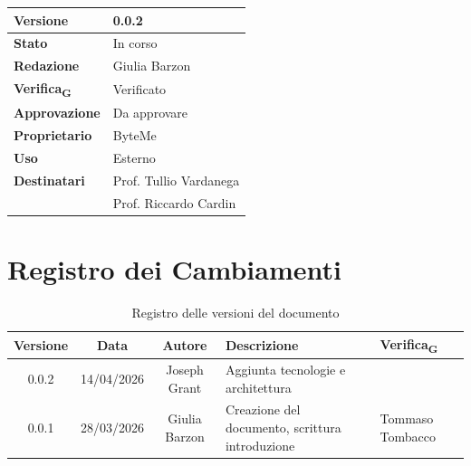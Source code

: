 \documentclass[11pt,a4paper]{article}
\newcommand{\gls}[1]{#1\textsubscript{G}}
\begin{document}
\begin{titlepage}
    \begin{table}[H]
        \centering
        \begin{tabular}{|l|p{5cm}|}
            \hline
            \textbf{Versione} & 0.0.2 \\
            \hline
            \textbf{Stato} & In corso \\
            \hline
            \textbf{Redazione} & Giulia Barzon \\
            \hline
            \textbf{\gls{Verifica}} & Verificato \\
            \hline
            \textbf{Approvazione} & Da approvare\\
            \hline
            \textbf{Proprietario} & ByteMe \\
            \hline
            \textbf{Uso} & Esterno \\
            \hline
            \textbf{Destinatari} & Prof. Tullio Vardanega \\ & Prof. Riccardo Cardin \\
            \hline
        \end{tabular}
    \end{table}
    
    \vfill
\end{titlepage}

\thispagestyle{empty}
\section*{Registro dei Cambiamenti}

\begin{table}[H]
    \centering
    \begin{tabular}{|c|c|c|>{\raggedright\arraybackslash}p{}|p{}|}
        \hline
        \textbf{Versione} & \textbf{Data} & \textbf{Autore} & \textbf{Descrizione} & \textbf{\gls{Verifica}} \\
        \hline
        0.0.2 & 14/04/2026 & Joseph Grant & Aggiunta tecnologie e architettura & \\
        \hline
        0.0.1 & 28/03/2026 & Giulia Barzon & Creazione del documento, scrittura introduzione & Tommaso Tombacco \\
        \hline
    \end{tabular}
    \caption{Registro delle versioni del documento}
    \label{tab:versionamento}
\end{table}
\newpage

\tableofcontents
\thispagestyle{empty}
\newpage
\end{document}
